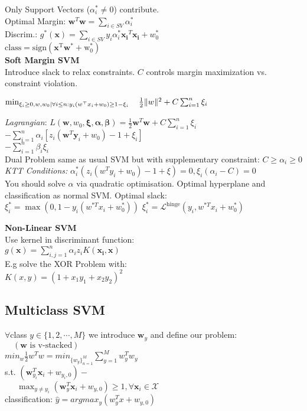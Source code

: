 Only Support Vectors ($\alpha^*_i\not=0$) contribute.\\
Optimal Margin: $\mathbf{w}^T\mathbf{w}=\sum_{i\in SV}\alpha_i^*$\\
Discrim.: $g^*(\mathbf{x}){=}\sum_{i\in SV}y_i\alpha^*_i\mathbf{x_i}^T\mathbf{x_i}{+}w^*_0$\\
$\mathrm{class} = \mathrm{sign(\mathbf{x}^T\mathbf{w}^*+w_0^*)}$ \\

\textbf{Soft Margin SVM} \\
Introduce slack to relax constraints. $C$ controls margin maximization vs. constraint violation.

$\min_{\xi_i\geq 0,w, w_0| \forall i \leq n: y_i (w^\top x_i + w_0) \geq 1-\xi_i} \\ \quad \frac{1}{2} \|w\|^2 + C\sum_{i=1}^n \xi_i $

\textit{Lagrangian}: $L(\mathbf{w}, w_0,\mathbf{\xi}, \mathbf{\alpha}, \mathbf{\beta}) {=}\frac{1}{2}\mathbf{w}^T\mathbf{w}+C\sum_{i=1}^n\xi_i$
${-}\sum_{i=1}^n\alpha_i[z_i(\mathbf{w}^T\mathbf{y}_i{+}w_0){-}1{+}\xi_i]$\\
${-}\sum_{i=1}^n\beta_i\xi_i$\\
Dual Problem same as usual SVM but with supplementary constraint:
$C \geq \alpha_i \geq 0$ \\
\textit{KTT Conditions:} 
$\alpha_i^*(z_i(w^Ty_i{+}w_0){-}1 + \xi){=} 0, \xi_i(\alpha_i-C) = 0$ \\
You should solve $\alpha$ via quadratic optimisation.
Optimal hyperplane and classification as normal SVM.
Optimal slack:  $\xi_i^* = \max(0, 1 - y_i (w^{*T} x_i + w_0^*))$
$\xi_i^* = \mathcal{L}^{\text{hinge}}(y_i,w^{*T} x_i + w_0^*)$

\textbf{Non-Linear SVM} \\
Use kernel in discriminant function: \\ $g(\mathbf{x})=\sum_{i,j=1}^n\alpha_iz_iK(\mathbf{x_i},\mathbf{x})$\\
E.g solve the XOR Problem with: \\
$K(x,y)=(1+x_1y_1+x_2y_2)^2$

\subsection*{Multiclass SVM}
$\forall$class $y\in\{1,2,\cdots,M\}$ we introduce $\mathbf{w}_y$ and define our problem: $\quad(\mathbf{w} \text{ is v-stacked})$\\
$min_w \frac{1}{2}w^Tw = min_{\{w_y\}_{n=1}^M} \sum_{y=1}^M w_y^Tw_y$ \\
s.t. $(\mathbf{w}_{y_i}^T\mathbf{x}_i+w_{y_i,0})-$\\
$\quad \ \ \max_{y\not=y_i}(\mathbf{w}_y^T\mathbf{x}_i+w_{y,0})\geq 1, \forall {\mathbf{x}_i\in \mathcal{X}}$ \\
classification: $\hat y = argmax_y (w_y^Tx + w_{y,0})$


